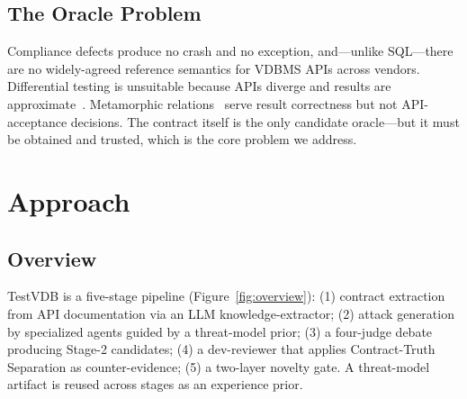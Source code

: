 \documentclass[sigconf, anonymous, review]{acmart}
\begin{document}
\subsection{The Oracle Problem}
Compliance defects produce no crash and no exception, and---unlike SQL---there are no widely-agreed reference semantics for VDBMS APIs across vendors. Differential testing is unsuitable because APIs diverge and results are approximate~\cite{roadmap25}. Metamorphic relations~\cite{metmap24} serve result correctness but not API-acceptance decisions. The contract itself is the only candidate oracle---but it must be obtained and trusted, which is the core problem we address.

\section{Approach}\label{sec:approach}

\subsection{Overview}
TestVDB is a five-stage pipeline (Figure~\ref{fig:overview}): (1) contract extraction from API documentation via an LLM knowledge-extractor; (2) attack generation by specialized agents guided by a threat-model prior; (3) a four-judge debate producing Stage-2 candidates; (4) a dev-reviewer that applies Contract-Truth Separation as counter-evidence; (5) a two-layer novelty gate. A threat-model artifact is reused across stages as an experience prior.
\end{document}
